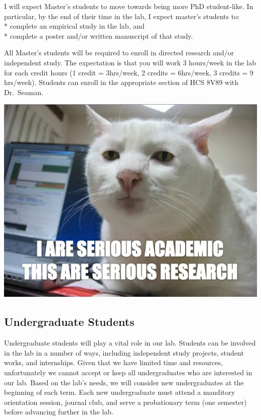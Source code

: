 \documentclass[]{book}
\begin{document}
I will expect Master's students to move towards being more PhD student-like. In particular, by the end of their time in the lab, I expect master's students to:\\
* complete an empirical study in the lab, and\\
* complete a poster and/or written manuscript of that study.

All Master's students will be required to enroll in directed research and/or independent study. The expectation is that you will work 3 hours/week in the lab for each credit hours (1 credit = 3hrs/week, 2 credits = 6hrs/week, 3 credits = 9 hrs/week). Students can enroll in the appropriate section of HCS 8V89 with Dr.~Seaman.

\includegraphics{images/researchcat.jpg}

\hypertarget{undergraduate-students}{%
\subsection{Undergraduate Students}\label{undergraduate-students}}

Undergraduate students will play a vital role in our lab. Students can be involved in the lab in a number of ways, including independent study projects, student works, and internships. Given that we have limited time and resources, unfortunately we cannot accept or keep all undergraduates who are interested in our lab. Based on the lab's needs, we will consider new undergraduates at the beginning of each term. Each new undergraduate must attend a manditory orientation session, journal club, and serve a probationary term (one semester) before advancing further in the lab.
\end{document}
